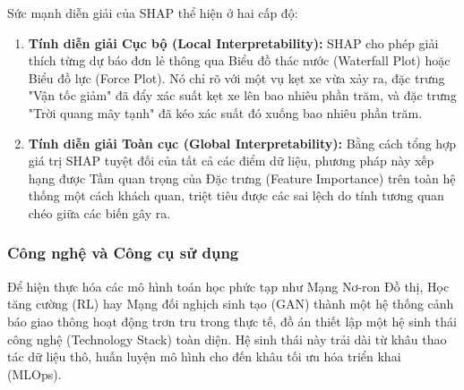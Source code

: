 Sức mạnh diễn giải của SHAP thể hiện ở hai cấp độ:
\begin{enumerate}
    \item \textbf{Tính diễn giải Cục bộ (Local Interpretability):} SHAP cho phép giải thích từng dự báo đơn lẻ thông qua Biểu đồ thác nước (Waterfall Plot) hoặc Biểu đồ lực (Force Plot). Nó chỉ rõ với một vụ kẹt xe vừa xảy ra, đặc trưng "Vận tốc giảm" đã đẩy xác suất kẹt xe lên bao nhiêu phần trăm, và đặc trưng "Trời quang mây tạnh" đã kéo xác suất đó xuống bao nhiêu phần trăm.
    \item \textbf{Tính diễn giải Toàn cục (Global Interpretability):} Bằng cách tổng hợp giá trị SHAP tuyệt đối của tất cả các điểm dữ liệu, phương pháp này xếp hạng được Tầm quan trọng của Đặc trưng (Feature Importance) trên toàn hệ thống một cách khách quan, triệt tiêu được các sai lệch do tính tương quan chéo giữa các biến gây ra.
\end{enumerate}

\subsubsection{Công nghệ và Công cụ sử dụng}
Để hiện thực hóa các mô hình toán học phức tạp như Mạng Nơ-ron Đồ thị, Học tăng cường (RL) hay Mạng đối nghịch sinh tạo (GAN) thành một hệ thống cảnh báo giao thông hoạt động trơn tru trong thực tế, đồ án thiết lập một hệ sinh thái công nghệ (Technology Stack) toàn diện. Hệ sinh thái này trải dài từ khâu thao tác dữ liệu thô, huấn luyện mô hình cho đến khâu tối ưu hóa triển khai (MLOps).

